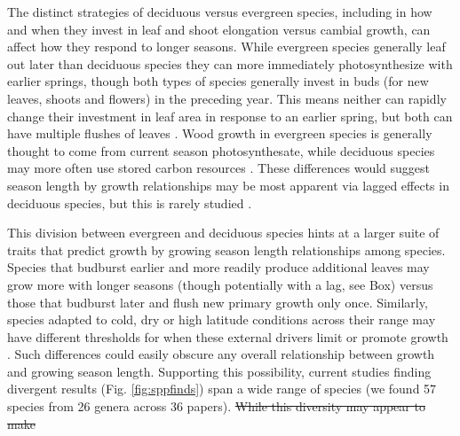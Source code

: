 \documentclass[11pt]{article}
\newcommand{\R}[1]{\label{#1}\linelabel{#1}}
\providecommand{\DIFdeltex}[1]{{\protect\color{red}\sout{#1}}}                      %
\providecommand{\DIFaddbegin}{} %
\providecommand{\DIFdelbegin}{} %
\providecommand{\DIFdelend}{} %
\providecommand{\DIFdel}[1]{\texorpdfstring{\DIFdeltex{#1}}{}} %
\newcommand{\DIFscaledelfig}{0.5}
\newlength{\DIFdelgraphicswidth} %
\newlength{\DIFdelgraphicsheight} %
\newcommand{\DIFaddincludegraphics}[2][]{{\color{blue}\fbox{\DIFOincludegraphics[#1]{#2}}}} %
\newcommand{\DIFdelincludegraphics}[2][]{%
\sbox{\DIFdelgraphicsbox}{\DIFOincludegraphics[#1]{#2}}%
\settoboxwidth{\DIFdelgraphicswidth}{\DIFdelgraphicsbox} %
\settoboxtotalheight{\DIFdelgraphicsheight}{\DIFdelgraphicsbox} %
\scalebox{\DIFscaledelfig}{%
\parbox[b]{\DIFdelgraphicswidth}{\usebox{\DIFdelgraphicsbox}\\[-\baselineskip] \rule{\DIFdelgraphicswidth}{0em}}\llap{\resizebox{\DIFdelgraphicswidth}{\DIFdelgraphicsheight}{%
\setlength{\unitlength}{\DIFdelgraphicswidth}%
\begin{picture}(1,1)%
\thicklines\linethickness{2pt} %
{\color[rgb]{1,0,0}\put(0,0){\framebox(1,1){}}}%
{\color[rgb]{1,0,0}\put(0,0){\line( 1,1){1}}}%
{\color[rgb]{1,0,0}\put(0,1){\line(1,-1){1}}}%
\end{picture}%
}\hspace*{3pt}}} %
} %
\DeclareRobustCommand{\DIFaddbegin}{\DIFOaddbegin \let\includegraphics\DIFaddincludegraphics} %
\DeclareRobustCommand{\DIFdelbegin}{\DIFOdelbegin \let\includegraphics\DIFdelincludegraphics} %
\DeclareRobustCommand{\DIFdelend}{\DIFOaddend \let\includegraphics\DIFOincludegraphics} %
\begin{document}
The distinct strategies of deciduous versus evergreen species, including in how and when they invest in leaf and shoot elongation versus cambial growth, can affect how they respond to longer seasons. While evergreen species generally leaf out later than deciduous species they can more immediately photosynthesize with earlier springs, though both types of species generally invest in buds (for new leaves, shoots and flowers) in the preceding year. This means neither can rapidly change their investment in leaf area in response to an earlier spring, but both can have multiple flushes of leaves \citep{day2011regulation,soolanayakanahally2013timing}. Wood growth in evergreen species is generally thought to come from current season photosynthesate, while deciduous species may more often use stored carbon resources \citep{gordon1968seasonal,monson2018finding}. These differences would suggest season length by growth relationships
may be most apparent via lagged effects in deciduous species, but this is rarely studied  \citep[and not clearly supported to date, see][]{coulthard2020limits,klesse2023legacy}. %

\DIFdelbegin %
\DIFdelend This division between evergreen and deciduous species hints at a larger suite of traits that predict growth by growing season length relationships among species. Species that budburst earlier and more readily produce additional leaves \citep[e.g. leaf flushes after budset, and other characteristics more common to `indeterminate' species,][]{kikuzawa1982leaf,Lechowicz:1984cr} may grow more with longer seasons (though potentially with a lag, see Box) \DIFdelbegin %
\DIFdelend versus those that budburst later and flush new primary growth only once. Similarly, species adapted to cold, dry or high latitude conditions across their range may have different thresholds for when these external drivers limit or promote growth \citep[e.g. some \emph{Populus} and \emph{Quercus} species,][and see Fig.\ref{fig:moraconcept}]{soolanayakanahally2013timing,mckown2016impacts,delpierre2017tree,de2022temperature}. Such differences could easily obscure any overall relationship between growth and growing season length. Supporting this possibility, current studies finding divergent results (Fig. \ref{fig:sppfinds}) span a wide range of species (we found  57 species from 26 genera across 36 papers). 
\DIFdelbegin \DIFdel{While this diversity may appear to make }\DIFdelend \DIFaddbegin 
\end{document}
